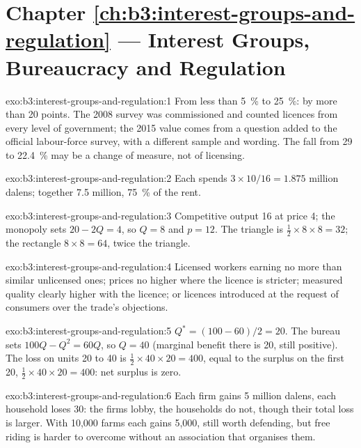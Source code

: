 \section*{Chapter \ref{ch:b3:interest-groups-and-regulation} --- Interest Groups, Bureaucracy and Regulation}

\begin{solution}{exo:b3:interest-groups-and-regulation:1}
From less than 5~\% to 25~\%: by more than 20 points. %
The 2008 survey was commissioned and counted licences from every level of government;
the 2015 value comes from a question added to the official labour-force survey, with
a different sample and wording. The fall from 29 to 22.4~\% may be a change of measure,
not of licensing.
\end{solution}

\begin{solution}{exo:b3:interest-groups-and-regulation:2}
Each spends $3 \times 10/16 = 1.875$ million dalens; together 7.5 million, 75~\% of the rent.
\end{solution}

\begin{solution}{exo:b3:interest-groups-and-regulation:3}
Competitive output 16 at price 4; the monopoly sets $20 - 2Q = 4$, so $Q = 8$ and $p = 12$. The
triangle is $\tfrac12 \times 8 \times 8 = 32$; the rectangle $8 \times 8 = 64$, twice the triangle.
\end{solution}

\begin{solution}{exo:b3:interest-groups-and-regulation:4}
Licensed workers earning no more than similar unlicensed ones; prices no higher
where the licence is stricter; measured quality clearly higher with the licence; or
licences introduced at the request of consumers over the trade's objections.
\end{solution}

\begin{solution}{exo:b3:interest-groups-and-regulation:5}
$Q^* = (100 - 60)/2 = 20$. The bureau sets $100Q - Q^2 = 60Q$, so $Q = 40$ (marginal benefit there is 20, still
positive). The loss on units 20 to 40 is $\tfrac12 \times 40 \times 20 = 400$, equal to the surplus on the first 20,
$\tfrac12 \times 40 \times 20 = 400$: net surplus is zero.
\end{solution}

\begin{solution}{exo:b3:interest-groups-and-regulation:6}
Each firm gains 5 million dalens, each household loses 30: the firms lobby, the
households do not, though their total loss is larger. With 10{,}000 farms each gains
5{,}000, still worth defending, but free riding is harder to overcome without an
association that organises them.
\end{solution}

